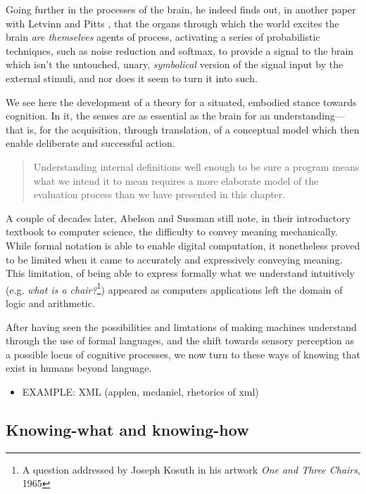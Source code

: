 Going further in the processes of the brain, he indeed finds out, in another paper with Letvinn and Pitts \citep{lettvin_what_1959}, that the organs through which the world excites the brain \emph{are themselves} agents of process, activating a series of probabilistic techniques, such as noise reduction and softmax, to provide a signal to the brain which isn't the untouched, unary, \emph{symbolical} version of the signal input by the external stimuli, and nor does it seem to turn it into such.

We see here the development of a theory for a situated, embodied stance towards cognition. In it, the senses are as essential as the brain for an understanding—that is, for the acquisition, through translation, of a conceptual model which then enable deliberate and successful action.

\vspace*{1\baselineskip}

\begin{quote}
    Understanding internal definitions well enough to be sure a program means what we intend it to mean requires a more elaborate model of the evaluation process than we have presented in this chapter. \citep{abelson_structure_1979}
\end{quote}

A couple of decades later, Abelson and Sussman still note, in their introductory textbook to computer science, the difficulty to convey meaning mechanically. While formal notation is able to enable digital computation, it nonetheless proved to be limited when it came to accurately and expressively  conveying meaning. This limitation, of being able to express formally what we understand intuitively (e.g. \emph{what is a chair?}\footnote{A question addressed by Joseph Kosuth in his artwork \emph{One and Three Chairs}, 1965}) appeared as computers applications left the domain of logic and arithmetic.

After having seen the possibilities and limtations of making machines understand through the use of formal languages, and the shift towards sensory perception as a possible locus of cognitive processes, we now turn to these ways of knowing that exist in humans beyond language.

\begin{itemize}
    \item EXAMPLE: XML (applen, mcdaniel, rhetorics of xml)
\end{itemize}

\subsection{Knowing-what and knowing-how} %


